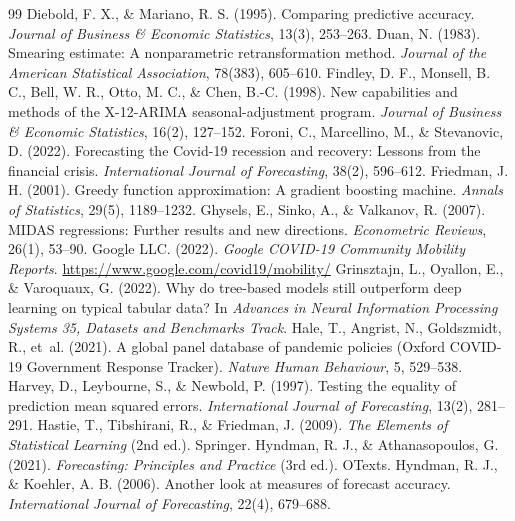 \documentclass{article}
\theoremstyle{plain}
\theoremstyle{definition}
\theoremstyle{remark}
\begin{document}
\begin{thebibliography}{99}
 Diebold, F. X., \& Mariano, R. S. (1995). Comparing predictive accuracy. \emph{Journal of Business \& Economic Statistics}, 13(3), 253--263.
 Duan, N. (1983). Smearing estimate: A nonparametric retransformation method. \emph{Journal of the American Statistical Association}, 78(383), 605--610.
 Findley, D. F., Monsell, B. C., Bell, W. R., Otto, M. C., \& Chen, B.-C. (1998). New capabilities and methods of the X-12-ARIMA seasonal-adjustment program. \emph{Journal of Business \& Economic Statistics}, 16(2), 127--152.
 Foroni, C., Marcellino, M., \& Stevanovic, D. (2022). Forecasting the Covid-19 recession and recovery: Lessons from the financial crisis. \emph{International Journal of Forecasting}, 38(2), 596--612.
 Friedman, J. H. (2001). Greedy function approximation: A gradient boosting machine. \emph{Annals of Statistics}, 29(5), 1189--1232.
 Ghysels, E., Sinko, A., \& Valkanov, R. (2007). MIDAS regressions: Further results and new directions. \emph{Econometric Reviews}, 26(1), 53--90.
 Google LLC. (2022). \emph{Google COVID-19 Community Mobility Reports}. \url{https://www.google.com/covid19/mobility/}
 Grinsztajn, L., Oyallon, E., \& Varoquaux, G. (2022). Why do tree-based models still outperform deep learning on typical tabular data? In \emph{Advances in Neural Information Processing Systems 35, Datasets and Benchmarks Track}.
 Hale, T., Angrist, N., Goldszmidt, R., et~al. (2021). A global panel database of pandemic policies (Oxford COVID-19 Government Response Tracker). \emph{Nature Human Behaviour}, 5, 529--538.
 Harvey, D., Leybourne, S., \& Newbold, P. (1997). Testing the equality of prediction mean squared errors. \emph{International Journal of Forecasting}, 13(2), 281--291.
 Hastie, T., Tibshirani, R., \& Friedman, J. (2009). \emph{The Elements of Statistical Learning} (2nd ed.). Springer.
 Hyndman, R. J., \& Athanasopoulos, G. (2021). \emph{Forecasting: Principles and Practice} (3rd ed.). OTexts.
 Hyndman, R. J., \& Koehler, A. B. (2006). Another look at measures of forecast accuracy. \emph{International Journal of Forecasting}, 22(4), 679--688.

\end{thebibliography}
\end{document}
